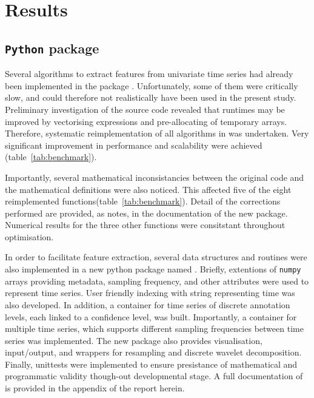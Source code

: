 \section{Results} \label{results}

\subsection{\texttt{Python} package}
Several algorithms to extract features from univariate time series had already been implemented in the \py{} package \pyeeg{}\citationneeded{}.
Unfortunately, some of them were critically slow, and could therefore not realistically have been used in the present study.
Preliminary investigation of the source code revealed that runtimes may be improved by vectorising expressions and pre-allocating of temporary arrays.
Therefore, systematic reimplementation of all algorithms in \pyeeg{} was undertaken.
Very significant improvement in performance and scalability were achieved (table~\ref{tab:benchmark}).



Importantly, several mathematical inconsistancies between the original code and the mathematical definitions were also noticed.
This affected five of the eight reimplemented functions(table~\ref{tab:benchmark}). 
Detail of the corrections performed are provided, as notes, in the documentation of the new package.
Numerical results for the three other functions were consitstant throughout optimisation.

In order to facilitate feature extraction, several data structures and routines were also implemented 
in a new python package named \pr{}.
Briefly, extentions of \texttt{numpy} arrays providing metadata, sampling frequency, and other attributes were used to represent time series.
User friendly indexing with string representing time was also developed.
In addition, a container for time series of discrete annotation levels, each linked to a confidence level, was built.
Importantly, a container for multiple time series, which supports different sampling frequencies
between time series was implemented.
The new package also provides visualisation, input/output, and wrappers for resampling and discrete wavelet decomposition.
Finally, unittests were implemented to ensure presistance of mathematical and programmatic validity though-out developmental stage.
A full documentation of \pr{} is provided in the appendix of the report herein.

